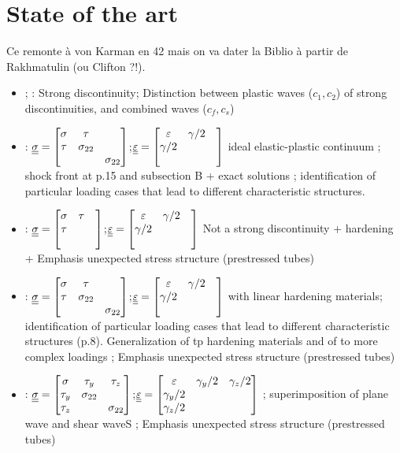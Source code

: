 \section{State of the art}
Ce remonte à von Karman en 42 mais on va dater la Biblio à partir de Rakhmatulin (ou Clifton ?!).
\begin{itemize}
\item \cite{Rakhmatulin} ; \cite{CRISTESCU19591605} : Strong discontinuity; Distinction between plastic waves ($c_1,c_2$) of strong discontinuities, and combined waves ($c_f,c_s$)
\item \cite{Bleich}: ${\underline{\underline{\sigma}}}=\left[\begin{matrix}\sigma & \tau & \\ \tau & \sigma_{22} & \\ & & \sigma_{22}\end{matrix}\right]$;${\underline{\underline{\varepsilon}}}=\left[\begin{matrix}\varepsilon & \gamma/2 & \\ \gamma/2 &  & \\ & & \end{matrix}\right]$ ideal elastic-plastic continuum ; shock front at p.15 and subsection B + exact solutions ; identification of particular loading cases that lead to different characteristic structures.
\item \cite{Clifton}: ${\underline{\underline{\sigma}}}=\left[\begin{matrix}\sigma & \tau & \\ \tau & & \\ & & \end{matrix}\right]$;${\underline{\underline{\varepsilon}}}=\left[\begin{matrix}\varepsilon & \gamma/2 & \\ \gamma/2 &  & \\ & & \end{matrix}\right]$ Not a strong discontinuity + hardening + Emphasis unexpected stress structure (prestressed tubes)
\item \cite{Ting68}: ${\underline{\underline{\sigma}}}=\left[\begin{matrix}\sigma & \tau & \\ \tau & \sigma_{22} & \\ & & \sigma_{22}\end{matrix}\right]$;${\underline{\underline{\varepsilon}}}=\left[\begin{matrix}\varepsilon & \gamma/2 & \\ \gamma/2 &  & \\ & & \end{matrix}\right]$ with linear hardening materials; identification of particular loading cases that lead to different characteristic structures (p.8). Generalization of \cite{Bleich} tp hardening materials and of \cite{Clifton} to more complex loadings ; Emphasis unexpected stress structure (prestressed tubes)
\item \cite{Ting69}:  ${\underline{\underline{\sigma}}}=\left[\begin{matrix}\sigma & \tau_y & \tau_z\\ \tau_y & \sigma_{22} & \\\tau_z & & \sigma_{22}\end{matrix}\right]$;${\underline{\underline{\varepsilon}}}=\left[\begin{matrix}\varepsilon & \gamma_y/2 & \gamma_z/2\\ \gamma_y/2 &  & \\ \gamma_z/2& & \end{matrix}\right]$ ; superimposition of plane wave and shear waveS ; Emphasis unexpected stress structure (prestressed tubes)

\end{itemize}

